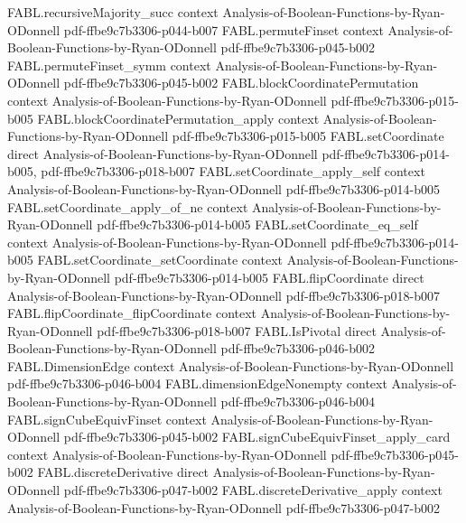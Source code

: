 \begin{theorem}
\proofstep
  {FABL.recursiveMajority_succ}
  {context}
  {Analysis-of-Boolean-Functions-by-Ryan-ODonnell}
  {pdf-ffbe9c7b3306-p044-b007}
\proofstep
  {FABL.permuteFinset}
  {context}
  {Analysis-of-Boolean-Functions-by-Ryan-ODonnell}
  {pdf-ffbe9c7b3306-p045-b002}
\proofstep
  {FABL.permuteFinset_symm}
  {context}
  {Analysis-of-Boolean-Functions-by-Ryan-ODonnell}
  {pdf-ffbe9c7b3306-p045-b002}
\proofstep
  {FABL.blockCoordinatePermutation}
  {context}
  {Analysis-of-Boolean-Functions-by-Ryan-ODonnell}
  {pdf-ffbe9c7b3306-p015-b005}
\proofstep
  {FABL.blockCoordinatePermutation_apply}
  {context}
  {Analysis-of-Boolean-Functions-by-Ryan-ODonnell}
  {pdf-ffbe9c7b3306-p015-b005}
\proofstep
  {FABL.setCoordinate}
  {direct}
  {Analysis-of-Boolean-Functions-by-Ryan-ODonnell}
  {pdf-ffbe9c7b3306-p014-b005,
    pdf-ffbe9c7b3306-p018-b007}
\proofstep
  {FABL.setCoordinate_apply_self}
  {context}
  {Analysis-of-Boolean-Functions-by-Ryan-ODonnell}
  {pdf-ffbe9c7b3306-p014-b005}
\proofstep
  {FABL.setCoordinate_apply_of_ne}
  {context}
  {Analysis-of-Boolean-Functions-by-Ryan-ODonnell}
  {pdf-ffbe9c7b3306-p014-b005}
\proofstep
  {FABL.setCoordinate_eq_self}
  {context}
  {Analysis-of-Boolean-Functions-by-Ryan-ODonnell}
  {pdf-ffbe9c7b3306-p014-b005}
\proofstep
  {FABL.setCoordinate_setCoordinate}
  {context}
  {Analysis-of-Boolean-Functions-by-Ryan-ODonnell}
  {pdf-ffbe9c7b3306-p014-b005}
\proofstep
  {FABL.flipCoordinate}
  {direct}
  {Analysis-of-Boolean-Functions-by-Ryan-ODonnell}
  {pdf-ffbe9c7b3306-p018-b007}
\proofstep
  {FABL.flipCoordinate_flipCoordinate}
  {context}
  {Analysis-of-Boolean-Functions-by-Ryan-ODonnell}
  {pdf-ffbe9c7b3306-p018-b007}
\proofstep
  {FABL.IsPivotal}
  {direct}
  {Analysis-of-Boolean-Functions-by-Ryan-ODonnell}
  {pdf-ffbe9c7b3306-p046-b002}
\proofstep
  {FABL.DimensionEdge}
  {context}
  {Analysis-of-Boolean-Functions-by-Ryan-ODonnell}
  {pdf-ffbe9c7b3306-p046-b004}
\proofstep
  {FABL.dimensionEdgeNonempty}
  {context}
  {Analysis-of-Boolean-Functions-by-Ryan-ODonnell}
  {pdf-ffbe9c7b3306-p046-b004}
\proofstep
  {FABL.signCubeEquivFinset}
  {context}
  {Analysis-of-Boolean-Functions-by-Ryan-ODonnell}
  {pdf-ffbe9c7b3306-p045-b002}
\proofstep
  {FABL.signCubeEquivFinset_apply_card}
  {context}
  {Analysis-of-Boolean-Functions-by-Ryan-ODonnell}
  {pdf-ffbe9c7b3306-p045-b002}
\proofstep
  {FABL.discreteDerivative}
  {direct}
  {Analysis-of-Boolean-Functions-by-Ryan-ODonnell}
  {pdf-ffbe9c7b3306-p047-b002}
\proofstep
  {FABL.discreteDerivative_apply}
  {context}
  {Analysis-of-Boolean-Functions-by-Ryan-ODonnell}
  {pdf-ffbe9c7b3306-p047-b002}

\end{theorem}
